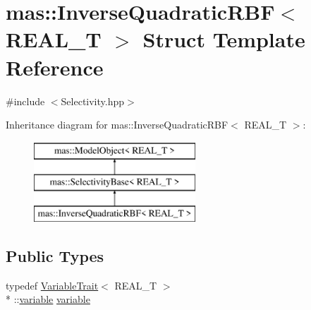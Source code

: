 \hypertarget{structmas_1_1_inverse_quadratic_r_b_f}{\section{mas\-:\-:Inverse\-Quadratic\-R\-B\-F$<$ R\-E\-A\-L\-\_\-\-T $>$ Struct Template Reference}
\label{structmas_1_1_inverse_quadratic_r_b_f}
}


{\ttfamily \#include $<$Selectivity.\-hpp$>$}

Inheritance diagram for mas\-:\-:Inverse\-Quadratic\-R\-B\-F$<$ R\-E\-A\-L\-\_\-\-T $>$\-:\begin{figure}[H]
\begin{center}
\leavevmode
\includegraphics[height=3.000000cm]{structmas_1_1_inverse_quadratic_r_b_f}
\end{center}
\end{figure}
\subsection*{Public Types}
\begin{DoxyCompactItemize}
\item 
typedef \hyperlink{structmas_1_1_variable_trait}{Variable\-Trait}$<$ R\-E\-A\-L\-\_\-\-T $>$\\*
\-::\hyperlink{structmas_1_1_inverse_quadratic_r_b_f_aa73b147b14646342ba3141b53752cb1b}{variable} \hyperlink{structmas_1_1_inverse_quadratic_r_b_f_aa73b147b14646342ba3141b53752cb1b}{variable}
\end{DoxyCompactItemize}
